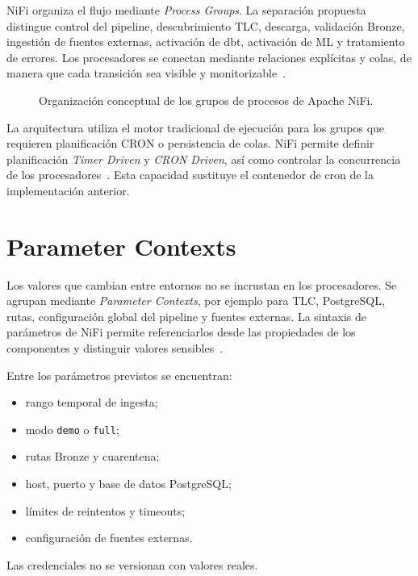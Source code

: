 NiFi organiza el flujo mediante \textit{Process Groups}. La separación propuesta distingue control del pipeline, descubrimiento TLC, descarga, validación Bronze, ingestión de fuentes externas, activación de dbt, activación de ML y tratamiento de errores. Los procesadores se conectan mediante relaciones explícitas y colas, de manera que cada transición sea visible y monitorizable~\cite{nifi_user_guide}.

\begin{figure}[H]
\centering
{}
\caption{Organización conceptual de los grupos de procesos de Apache NiFi.}%
\label{fig:nifi-process-groups}%
\end{figure}

La arquitectura utiliza el motor tradicional de ejecución para los grupos que requieren planificación CRON o persistencia de colas. NiFi permite definir planificación \textit{Timer Driven} y \textit{CRON Driven}, así como controlar la concurrencia de los procesadores~\cite{nifi_user_guide}. Esta capacidad sustituye el contenedor de cron de la implementación anterior.

\section{Parameter Contexts}

Los valores que cambian entre entornos no se incrustan en los procesadores. Se agrupan mediante \textit{Parameter Contexts}, por ejemplo para TLC, PostgreSQL, rutas, configuración global del pipeline y fuentes externas. La sintaxis de parámetros de NiFi permite referenciarlos desde las propiedades de los componentes y distinguir valores sensibles~\cite{nifi_user_guide}.

Entre los parámetros previstos se encuentran:

\begin{itemize}
\item rango temporal de ingesta;
\item modo \texttt{demo} o \texttt{full};
\item rutas Bronze y cuarentena;
\item host, puerto y base de datos PostgreSQL\@;
\item límites de reintentos y timeouts;
\item configuración de fuentes externas.
\end{itemize}

Las credenciales no se versionan con valores reales.

